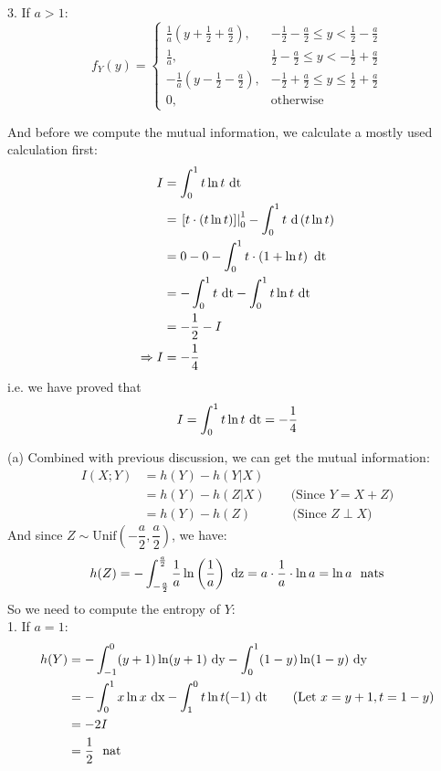 3. If $a>1$: \\
$$f_Y(y)=\begin{cases}
\frac{1}{a}\left(y+\frac{1}{2}+\frac{a}{2}\right), & -\frac{1}{2}-\frac{a}{2}\leq y<\frac{1}{2}-\frac{a}{2} \\
\frac{1}{a}, & \frac{1}{2}-\frac{a}{2}\leq y<-\frac{1}{2}+\frac{a}{2} \\
-\frac{1}{a}\left(y-\frac{1}{2}-\frac{a}{2}\right), & -\frac{1}{2}+\frac{a}{2}\leq y\leq\frac{1}{2}+\frac{a}{2} \\
0, & \text{otherwise}
\end{cases}$$

And before we compute the mutual information, we calculate a mostly used calculation first:
\begin{align*}
I &= \int_{0}^{1}t\ln t {\ \text{dt}} \\
&= \left. \left[t\cdot \left(t\ln t\right)\right]\right|_{0}^{1}-\int_{0}^{1} t \text{\ d}\left(t\ln t\right) \\
&= 0 - 0 - \int_{0}^{1} t \cdot \left(1+\ln t\right) {\ \text{dt}} \\
&= -\int_{0}^{1} t {\ \text{dt}} - \int_{0}^{1} t\ln t {\ \text{dt}} \\
&= -\frac{1}{2} - I \\
\Rightarrow I &= -\dfrac{1}{4}
\end{align*}
i.e. we have proved that
$$I=\int_{0}^{1}t\ln t {\ \text{dt}} = -\dfrac{1}{4}$$

(a) Combined with previous discussion, we can get the mutual information:
\begin{align*}
I(X;Y) &= h(Y)-h(Y|X) \\
&= h(Y)-h(Z|X) \qquad \text{(Since $Y=X+Z$)} \\
&= h(Y)-h(Z) \qquad\quad\ \text{(Since $Z\perp X$)}
\end{align*}
And since $Z\sim \text{Unif}\left(-\dfrac{a}{2},\dfrac{a}{2}\right)$, we have:
$$ h(Z) = -\int_{-\frac{a}{2}}^{\frac{a}{2}}\dfrac{1}{a}\ln\left(\dfrac{1}{a}\right) {\ \text{dz}} = a\cdot \dfrac{1}{a}\cdot \ln a = \ln a \ \ \text{nats}$$
So we need to compute the entropy of $Y$: \\
1. If $a=1$:
\begin{align*}
h(Y) &= -\int_{-1}^{0}(y+1)\ln(y+1) {\ \text{dy}} - \int_{0}^{1}(1-y)\ln(1-y) {\ \text{dy}} \\
&= -\int_{0}^{1}x\ln x {\ \text{dx}} - \int_{1}^{0}t\ln t (-1) {\ \text{dt}} \qquad \text{(Let $x=y+1, t=1-y$)} \\
&= -2I \\
&= \dfrac{1}{2} \ \ \text{nat}
\end{align*}

